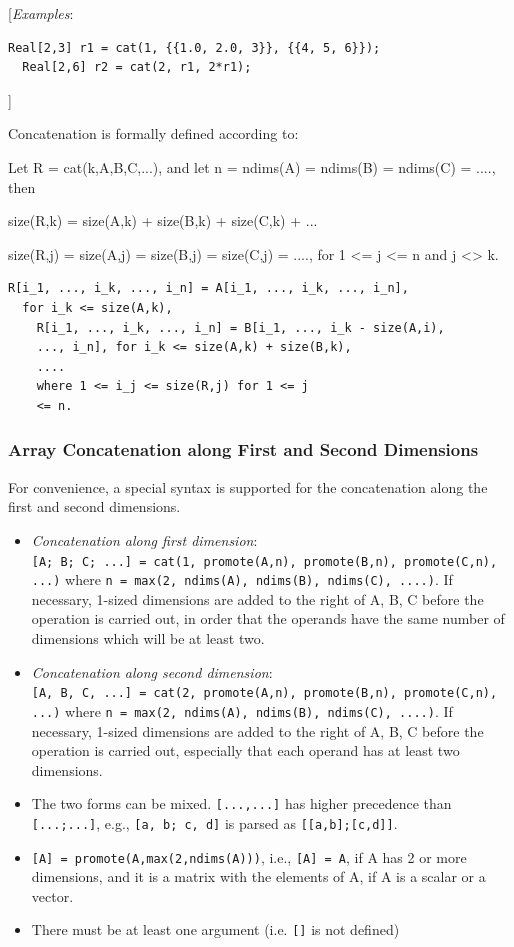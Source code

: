 \documentclass[10pt,a4paper]{report}
\def\doublelabel#1{\label{#1}\hypertarget{#1}{}}
\begin{document}
{[}\emph{Examples}:

\begin{lstlisting}[language=modelica]
  Real[2,3] r1 = cat(1, {{1.0, 2.0, 3}}, {{4, 5, 6}});
  Real[2,6] r2 = cat(2, r1, 2*r1);
\end{lstlisting}
{]}

Concatenation is formally defined according to:

Let R = cat(k,A,B,C,...), and let n = ndims(A) = ndims(B) = ndims(C) =
...., then

size(R,k) = size(A,k) + size(B,k) + size(C,k) + ...

size(R,j) = size(A,j) = size(B,j) = size(C,j) = ...., for 1 \textless{}=
j \textless{}= n and j \textless{}\textgreater{} k.

\begin{lstlisting}[language=modelica]
  R[i_1, ..., i_k, ..., i_n] = A[i_1, ..., i_k, ..., i_n],
  for i_k <= size(A,k),
    R[i_1, ..., i_k, ..., i_n] = B[i_1, ..., i_k - size(A,i),
    ..., i_n], for i_k <= size(A,k) + size(B,k),
    ....
    where 1 <= i_j <= size(R,j) for 1 <= j
    <= n.
\end{lstlisting}
\subsubsection{Array Concatenation along First and Second Dimensions}\doublelabel{array-concatenation-along-first-and-second-dimensions}

For convenience, a special syntax is supported for the concatenation
along the first and second dimensions.

\begin{itemize}
\item
  \emph{Concatenation along first dimension}:\\
\lstinline![A; B; C; ...] = cat(1, promote(A,n), promote(B,n), promote(C,n),  ...)!
where \lstinline!n = max(2, ndims(A), ndims(B), ndims(C), ....)!. If necessary, 1-sized
  dimensions are added to the right of A, B, C before the operation is
  carried out, in order that the operands have the same number of
  dimensions which will be at least two.
\item
  \emph{Concatenation along second dimension}:\\
\lstinline![A, B, C, ...] = cat(2, promote(A,n), promote(B,n), promote(C,n), ...)! 
where \lstinline!n = max(2, ndims(A), ndims(B), ndims(C), ....)!. If necessary, 1-sized
  dimensions are added to the right of A, B, C before the operation is
  carried out, especially that each operand has at least two dimensions.
\item
  The two forms can be mixed. \lstinline![...,...]! has higher precedence than
 \lstinline![...;...]!, e.g., \lstinline![a, b; c, d]! is parsed as \lstinline![[a,b];[c,d]]!.
\item
\lstinline![A] = promote(A,max(2,ndims(A)))!, i.e., \lstinline![A] = A!, if A has 2 or
  more dimensions, and it is a matrix with the elements of A, if A is a
  scalar or a vector.
\item
  There must be at least one argument (i.e. \lstinline![]! is not defined)
\end{itemize}
\end{document}
